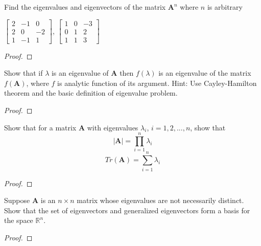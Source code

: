\documentclass[conference,12pt,onecolumn,compsoc]{IEEEtran}
\begin{document}
\begin{exercise}
Find the eigenvalues and eigenvectors of the matrix $\textbf{A}^n$ where $n$ is arbitrary
\begin{center}

$\begin{bmatrix} 2 & -1 & 0 \\ 
2 & 0 & -2 \\
 1 & -1 & 1  \end{bmatrix}$, $\begin{bmatrix} 1 & 0 & -3 \\ 
0 & 1 & 2 \\
 1 & 1 & 3  \end{bmatrix}$
\end{center}
\end{exercise}
\begin{proof}

\end{proof}

\begin{exercise}
Show that if $\lambda$ is an eigenvalue of \textbf{A} then $f(\lambda)$ is an eigenvalue of the matrix $f(\textbf{A})$, where $f$ is analytic function of its argument. Hint: Use Cayley-Hamilton theorem and the basic definition of eigenvalue problem.
\end{exercise}
\begin{proof}

\end{proof}

\begin{exercise}
Show that for a matrix \textbf{A} with eigenvalues $\lambda_i$, $i=1,2,...,n$, show that
\begin{equation}
|\textbf{A}| = \prod_{i=1}^n \lambda_i
\nonumber
\end{equation}
\begin{equation}
Tr(\textbf{A}) = \sum_{i=1}^n \lambda_i
\nonumber
\end{equation}
\end{exercise}
\begin{proof}

\end{proof}

\begin{exercise}
Suppose \textbf{A} is an $n \times n$ matrix whose eigenvalues are not necessarily distinct. Show that the set of eigenvectors and generalized eigenvectors form a basis for the space $\mathbb{R}^n$.
\end{exercise}
\begin{proof}

\end{proof}
\end{document}

